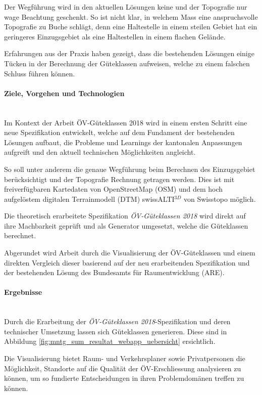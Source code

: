 Der Wegführung wird in den aktuellen Lösungen keine und der Topografie nur wage Beachtung geschenkt.
So ist nicht klar, in welchem Mass eine anspruchsvolle Topografie zu Buche schlägt, denn eine Haltestelle in einem steilen Gebiet hat ein geringeres Einzugsgebiet als eine Haltestellen in einem flachen Gelände.

Erfahrungen aus der Praxis haben gezeigt, dass die bestehenden Lösungen einige Tücken in der Berechnung der Güteklassen aufweisen, welche zu einem falschen Schluss führen können.

\paragraph{Ziele, Vorgehen und Technologien}~\\
Im Kontext der Arbeit ÖV-Güteklassen 2018 wird in einem ersten Schritt eine neue Spezifikation entwickelt, welche auf dem Fundament der bestehenden Lösungen aufbaut, die Probleme und Learnings der kantonalen Anpassungen aufgreift und den aktuell technischen Möglichkeiten angleicht.

So soll unter anderem die genaue Wegführung beim Berechnen des Einzugsgebiet berücksichtigt und der Topografie Rechnung getragen werden.
Dies ist mit freiverfügbaren Kartedaten von OpenStreetMap (OSM) und dem   hoch aufgelöstem digitalen Terrainmodell (DTM) swissALTI$^{3D}$ von Swisstopo möglich.

Die theoretisch erarbeitete Spezifikation \emph{ÖV-Güteklassen 2018} wird direkt auf ihre Machbarkeit geprüft und als Generator umgesetzt, welche die Güteklassen berechnet.

Abgerundet wird Arbeit durch die Visualisierung der ÖV-Güteklassen und einem direkten Vergleich dieser basierend auf der neu erarbeitenden Spezifikation  und der bestehenden Lösung des Bundesamts für Raumentwicklung (ARE).

\paragraph{Ergebnisse}~\\
Durch die Erarbeitung der \emph{ÖV-Güteklassen 2018}-Spezifikation und deren technischer Umsetzung lassen sich Güteklassen generieren.
Diese sind in Abbildung \ref{fig:mntg_sum_resultat_webapp_uebersicht} ersichtlich.

Die Visualisierung bietet Raum- und Verkehrsplaner sowie Privatpersonen die Möglichkeit, Standorte auf die Qualität der ÖV-Erschliessung analysieren zu können, um so fundierte Entscheidungen in ihren Problemdomänen treffen zu können.

